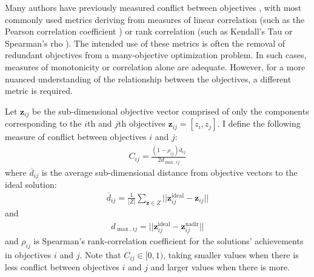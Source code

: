 Many authors have previously measured conflict between objectives \cite{brockhoff2009objective}\cite{purshouse2003conflict}\cite{gal1977redundant}, with most commonly used metrics deriving from measures of linear correlation (such as the Pearson correlation coefficient \cite{deb2006searching}) or rank correlation (such as Kendall's Tau \cite{kanoulas2009empirical} or Spearman's rho \cite{karande2012application}%
). The intended use of these metrics is often the removal of redundant objectives from a many-objective optimization problem. In such cases, measures of monotonicity or correlation alone are adequate. However, for a more nuanced understanding of the relationship between the objectives, a different metric is required.

Let $\mathbf{z}_{ij}$ be the sub-dimensional objective vector comprised of only the components corresponding to the $i$th and $j$th objectives $\mathbf{z}_{ij} = [z_i,z_j]$. I define the following measure of conflict between objectives $i$ and $j$:
\begin{align}
C_{ij} = \frac{(1-\rho_{ij})\overbar{d}_{ij}}{2 d_{\max,ij}} \label{eqn:defConflict}
\end{align}
where $\overbar{d}_{ij}$ is the average sub-dimensional distance from objective vectors to the ideal solution:
\begin{align}
\overbar{d}_{ij} = \frac{1}{|Z|} \sum_{\mathbf{z} \in Z} ||\mathbf{z}^{\text{ideal}}_{ij} - \mathbf{z}_{ij}||
\end{align}
and
\begin{align}
d_{\max,ij} = ||\mathbf{z}^{\text{ideal}}_{ij} - \mathbf{z}^{\text{nadir}}_{ij}||
\end{align}
and $\rho_{ij}$ is Spearman's rank-correlation coefficient for the solutions' achievements in objectives $i$ and $j$. Note that $C_{ij} \in [0,1)$, taking smaller values when there is less conflict between objectives $i$ and $j$ and larger values when there is more.

